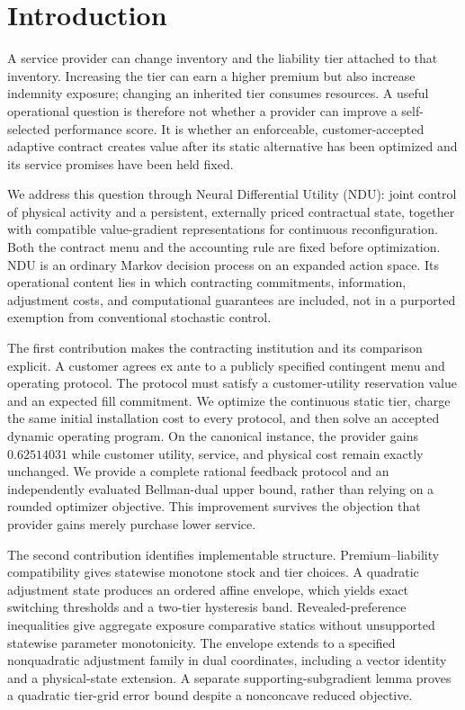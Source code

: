 \documentclass[11pt,letterpaper]{article}
\theoremstyle{definition}
\newcommand{\1}{\mathbf 1}
\begin{document}
\section{Introduction}
A service provider can change inventory and the liability tier attached to that inventory. Increasing the tier can earn a higher premium but also increase indemnity exposure; changing an inherited tier consumes resources. A useful operational question is therefore not whether a provider can improve a self-selected performance score. It is whether an enforceable, customer-accepted adaptive contract creates value after its static alternative has been optimized and its service promises have been held fixed.

We address this question through Neural Differential Utility (NDU): joint control of physical activity and a persistent, externally priced contractual state, together with compatible value-gradient representations for continuous reconfiguration. Both the contract menu and the accounting rule are fixed before optimization. NDU is an ordinary Markov decision process on an expanded action space. Its operational content lies in which contracting commitments, information, adjustment costs, and computational guarantees are included, not in a purported exemption from conventional stochastic control.

The first contribution makes the contracting institution and its comparison explicit. A customer agrees ex ante to a publicly specified contingent menu and operating protocol. The protocol must satisfy a customer-utility reservation value and an expected fill commitment. We optimize the continuous static tier, charge the same initial installation cost to every protocol, and then solve an accepted dynamic operating program. On the canonical instance, the provider gains $0.62514031$ while customer utility, service, and physical cost remain exactly unchanged. We provide a complete rational feedback protocol and an independently evaluated Bellman-dual upper bound, rather than relying on a rounded optimizer objective. This improvement survives the objection that provider gains merely purchase lower service.

The second contribution identifies implementable structure. Premium--liability compatibility gives statewise monotone stock and tier choices. A quadratic adjustment state produces an ordered affine envelope, which yields exact switching thresholds and a two-tier hysteresis band. Revealed-preference inequalities give aggregate exposure comparative statics without unsupported statewise parameter monotonicity. The envelope extends to a specified nonquadratic adjustment family in dual coordinates, including a vector identity and a physical-state extension. A separate supporting-subgradient lemma proves a quadratic tier-grid error bound despite a nonconcave reduced objective.
\end{document}

